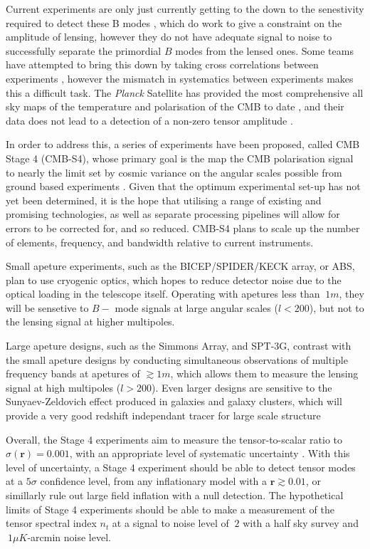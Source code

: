 Current experiments are only just currently getting to the down to the senestivity required to detect these B modes  \cite{1412.0626} \cite{1307.5830} \cite{1403.2369}, which do work to give a constraint on the amplitude of lensing, however they do not have adequate signal to noise to successfully separate the primordial $B$ modes from the lensed ones. Some teams have attempted to bring this down by taking cross correlations between experiments \cite{1502.00612}, however the mismatch in systematics between experiments makes this a difficult task. The \textit{Planck} Satellite has provided the most comprehensive all sky maps of the temperature and polarisation of the CMB to date \cite{1807.06205}, and their data does not lead to a detection of a non-zero tensor amplitude \cite{1807.06211}.

\par In order to address this, a series of experiments have been proposed, called CMB Stage 4 (CMB-S4), whose primary goal is the map the CMB polarisation signal to nearly the limit set by cosmic variance on the angular scales possible from ground based experiments \cite{1610.02743}. Given that the optimum experimental set-up has not yet been determined, it is the hope that utilising a range of existing and promising technologies, as well as separate processing pipelines will allow for errors to be corrected for, and so reduced. CMB-S4 plans to scale up the number of elements, frequency, and bandwidth relative to current instruments.

\par Small apeture experiments, such as the BICEP/SPIDER/KECK array, or ABS, plan to use cryogenic optics, which hopes to reduce detector noise due to the optical loading in the telescope itself. Operating with apetures less than $~ 1 m$, they will be sensetive to $B-$ mode signals at large angular scales ($l<200$), but not to the lensing signal at higher multipoles.

\par Large apeture designs, such as the Simmons Array, and SPT-3G, contrast with the small apeture designs by conducting simultaneous observations of multiple frequency bands at apetures of $\gtrsim 1 m $, which allows them to measure the lensing signal at high multipoles ($l>200$). Even larger designs are sensitive to the Sunyaev-Zeldovich effect produced in galaxies and galaxy clusters, which will provide a very good redshift independant tracer for large scale structure \cite{math/0208192}

\par Overall, the Stage 4 experiments aim to measure the tensor-to-scalar ratio to $\sigma(\textbf{r}) = 0.001$, with an appropriate level of systematic uncertainty \cite{1309.5381}. With this level of uncertainty, a Stage 4 experiment should be able to detect tensor modes at a $5\sigma$ confidence level, from any inflationary model with a $\textbf{r}\gtrsim 0.01$, or simillarly rule out large field inflation with a null detection. The hypothetical limits of Stage 4 experiments should be able to make a measurement of the tensor spectral index $n_t$ at a signal to noise level of $~2$ with a half sky survey and $~1 \mu K$-arcmin noise level.

